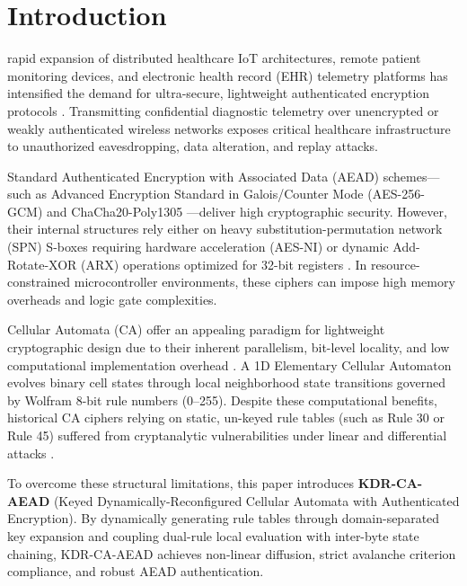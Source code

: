 \section{Introduction}
\label{sec:introduction}

 rapid expansion of distributed healthcare IoT architectures, remote patient monitoring devices, and electronic health record (EHR) telemetry platforms has intensified the demand for ultra-secure, lightweight authenticated encryption protocols \cite{rogaway2002authenticated}. Transmitting confidential diagnostic telemetry over unencrypted or weakly authenticated wireless networks exposes critical healthcare infrastructure to unauthorized eavesdropping, data alteration, and replay attacks.

Standard Authenticated Encryption with Associated Data (AEAD) schemes—such as Advanced Encryption Standard in Galois/Counter Mode (AES-256-GCM) \cite{dworkin2007recommendation} and ChaCha20-Poly1305 \cite{rfc8439}—deliver high cryptographic security. However, their internal structures rely either on heavy substitution-permutation network (SPN) S-boxes requiring hardware acceleration (AES-NI) \cite{daemen2002design} or dynamic Add-Rotate-XOR (ARX) operations optimized for 32-bit registers \cite{bernstein2008chacha}. In resource-constrained microcontroller environments, these ciphers can impose high memory overheads and logic gate complexities.

Cellular Automata (CA) offer an appealing paradigm for lightweight cryptographic design due to their inherent parallelism, bit-level locality, and low computational implementation overhead \cite{wolfram1983statistical, wolfram1986random}. A 1D Elementary Cellular Automaton evolves binary cell states through local neighborhood state transitions governed by Wolfram 8-bit rule numbers (0--255). Despite these computational benefits, historical CA ciphers relying on static, un-keyed rule tables (such as Rule 30 or Rule 45) suffered from cryptanalytic vulnerabilities under linear and differential attacks \cite{gutowitz1993cryptology, nandi2002theory}.

To overcome these structural limitations, this paper introduces \textbf{KDR-CA-AEAD} (Keyed Dynamically-Reconfigured Cellular Automata with Authenticated Encryption). By dynamically generating rule tables through domain-separated key expansion and coupling dual-rule local evaluation with inter-byte state chaining, KDR-CA-AEAD achieves non-linear diffusion, strict avalanche criterion compliance, and robust AEAD authentication.

